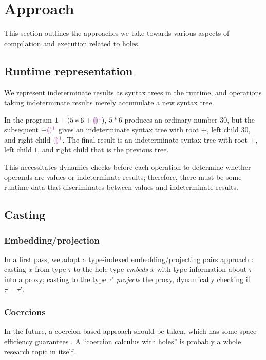 \documentclass[index.tex]{subfiles}
\begin{document}
\section{Approach}
\label{sec:approach}
This section outlines the approaches we take towards various aspects of compilation and execution
related to holes.

\subsection{Runtime representation}
\label{sec:runtime-representation}
We represent indeterminate results as syntax trees in the runtime, and operations taking
indeterminate results merely accumulate a new syntax tree.
%
\begin{example}
  In the program $1 + (5 * 6 + \SyEHole{1}{})$, $5 * 6$ produces an ordinary number $30$, but the
  subsequent $+ \SyEHole{1}{}$ gives an indeterminate syntax tree with root $+$, left child $30$, and
  right child $\SyEHole{1}{}$. The final result is an indeterminate syntax tree with root $+$, left
  child $1$, and right child that is the previous tree.
\end{example}
%
\noindent This necessitates dynamics checks before each operation to determine whether operands are
values or indeterminate results; therefore, there must be some runtime data that discriminates
between values and indeterminate results.

\subsection{Casting}
\label{sec:casting}

\subsubsection{Embedding/projection}
In a first pass, we adopt a type-indexed embedding/projecting pairs approach \cite{benton2005,
new2018}: casting $x$ from type $\tau$ to the hole type \emph{embeds} $x$ with type information
about $\tau$ into a proxy; casting to the type $\tau'$ \emph{projects} the proxy, dynamically
checking if $\tau = \tau'$.

\subsubsection{Coercions}
In the future, a coercion-based approach should be taken, which has some space efficiency guarantees
\cite{herman2010, kuhlenschmidt2019}. A ``coercion calculus with holes'' is probably a whole
research topic in itself.
\end{document}
